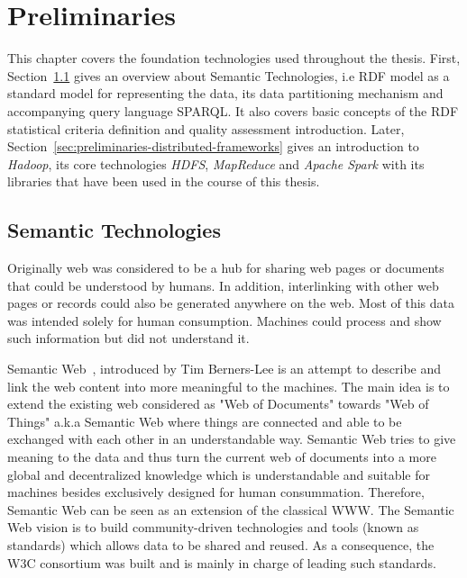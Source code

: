 \chapter{Preliminaries}
\label{chapter:preliminaries}
This chapter covers the foundation technologies used throughout the thesis.
First, Section~\ref{sec:preliminaries-semantic-technologies} gives an overview about Semantic Technologies, i.e \gls{RDF} model as a standard model for representing the data, its data partitioning mechanism and accompanying query language \gls{SPARQL}.
It also covers basic concepts of the \gls{RDF} statistical criteria definition and quality assessment introduction. 
Later, Section~\ref{sec:preliminaries-distributed-frameworks} gives an introduction to \textit{Hadoop}, its core technologies \textit{\gls{HDFS}}, \textit{MapReduce} and \textit{Apache Spark} with its libraries that have been used in the course of this thesis.

\section{Semantic Technologies}
\label{sec:preliminaries-semantic-technologies}
Originally web was considered to be a hub for sharing web pages or documents that could be understood by humans.
In addition, interlinking with other web pages or records could also be generated anywhere on the web. 
Most of this data was intended solely for human consumption.
Machines could process and show such information but did not understand it.

Semantic Web~\cite{bernerslee2001semantic}, introduced by Tim Berners-Lee is an attempt to describe and link the web content into more meaningful to the machines.
The main idea is to extend the existing web considered as "Web of Documents" towards "Web of Things" a.k.a Semantic Web where things are connected and able to be exchanged with each other in an understandable way.
Semantic Web tries to give meaning to the data and thus turn the current web of documents into a more global and decentralized knowledge which is understandable and suitable for machines besides exclusively designed for human consummation.
Therefore, Semantic Web can be seen as an extension of the classical \gls{WWW}.
The Semantic Web vision is to build community-driven technologies and tools (known as standards) which allows data to be shared and reused.
As a consequence, the \gls{W3C} consortium was built and is mainly in charge of leading such standards.

